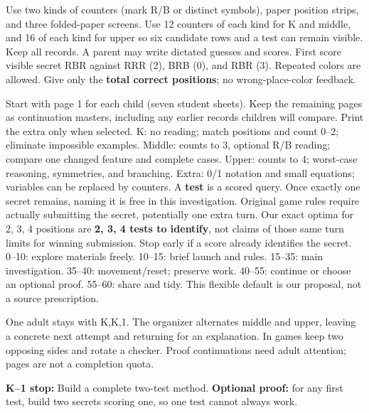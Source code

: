 \documentclass[11pt]{article}
\begin{document}
Use two kinds of counters (mark R/B or distinct symbols), paper position strips, and three folded-paper screens. Use 12 counters of each kind for K and middle, and 16 of each kind for upper so six candidate rows and a test can remain visible. Keep all records. A parent may write dictated guesses and scores. First score visible secret RBR against RRR (2), BRB (0), and RBR (3). Repeated colors are allowed. Give only the \textbf{total correct positions}; no wrong-place-color feedback.

Start with page 1 for each child (seven student sheets). Keep the remaining pages as continuation masters, including any earlier records children will compare. Print the extra only when selected. K: no reading; match positions and count 0--2; eliminate impossible examples. Middle: counts to 3, optional R/B reading; compare one changed feature and complete cases. Upper: counts to 4; worst-case reasoning, symmetries, and branching. Extra: 0/1 notation and small equations; variables can be replaced by counters.
A \textbf{test} is a scored query. Once exactly one secret remains, naming it is free in this investigation. Original game rules require actually submitting the secret, potentially one extra turn. Our exact optima for 2, 3, 4 positions are \textbf{2, 3, 4 tests to identify}, not claims of those same turn limits for winning submission. Stop early if a score already identifies the secret.
0--10: explore materials freely. 10--15: brief launch and rules. 15--35: main investigation. 35--40: movement/reset; preserve work. 40--55: continue or choose an optional proof. 55--60: share and tidy. This flexible default is our proposal, not a source prescription.

One adult stays with K,K,1. The organizer alternates middle and upper, leaving a concrete next attempt and returning for an explanation. In games keep two opposing sides and rotate a checker. Proof continuations need adult attention; pages are not a completion quota.

\textbf{K--1 stop:} Build a complete two-test method. \textbf{Optional proof:} for any first test, build two secrets scoring one, so one test cannot always work.
\end{document}
